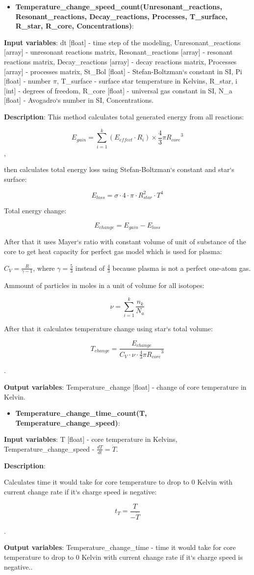 \documentclass[a4paper,12pt]{article}
\newcommand{\namefunction}[4]{
  \begin{itemize}
    \item \textbf{#1}:
  \end{itemize}
  
  \textbf{Input variables}: #2.
  
  \textbf{Description}: #3.
  
  \textbf{Output variables}: #4.
}
\begin{document}
\namefunction{Temperature\_change\_speed\_count(Unresonant\_reactions, Resonant\_reactions, Decay\_reactions, Processes, T\_surface, R\_star, R\_core, Concentrations)}{dt [float] - time step of the modeling, Unresonant\_reactions [array] - unresonant reactions matrix, Resonant\_reactions [array] - resonant reactions matrix, Decay\_reactions [array] - decay reactions matrix, Processes [array] - processes matrix, St\_Bol [float] - Stefan-Boltzman`s constant in SI, Pi [float] - number $\pi$, T\_surface - surface star temperature in Kelvins, R\_star, i [int] - degrees of freedom, R\_core [float] - universal gas constant in SI, N\_a [float] - Avogadro`s number in SI, Concentrations}{This method calculates total generated energy from all reactions:

\[{E_{gain}} = \sum_{i = 1}^{k} ({E_{effect}} \cdot {R_i}) \times \frac{4}{3} \pi{R_{core}}^{3}\],

 then calculates total energy loss using Stefan-Boltzman`s constant and star`s surface:

\[E_{loss} = \sigma \cdot 4 \cdot \pi \cdot R_{star}^2 \cdot T^4\]

Total energy change:

\[E_{change} = E_{gain} - E_{loss}\]

After that it uses Mayer`s ratio with constant volume of unit of substance of the core to get heat capacity for perfect gas model which is used for plasma:

$C_{V} = \frac{R}{\gamma - 1}$, where $\gamma = \frac{5}{3}$ instead of $\frac{4}{3}$ because plasma is not a perfect one-atom gas.

Ammount of particles in moles in a unit of volume for all isotopes:

\[\nu = \sum_{i = 1}^{k} \frac{n_k}{N_a}\]

After that it calculates temperature change using star`s total volume:

\[T_{change} = \frac{E_{change}}{C_{V} \cdot \nu \cdot \frac{4}{3} \pi{R_{core}}^{3}}\]

}{Temperature\_change [float] - change of core temperature in Kelvin}

\namefunction{Temperature\_change\_time\_count(T, Temperature\_change\_speed)}{T [float] - core temperature in Kelvins, Temperature\_change\_speed - $\frac{dT}{dt} = \dot{T}$}{

Calculates time it would take for core temperature to drop to 0 Kelvin with current change rate if it`s charge speed is negative:

\[t_{T} = \frac{T}{-\dot{T}}\]

}{Temperature\_change\_time - time it would take for core temperature to drop to 0 Kelvin with current change rate if it`s charge speed is negative.}
\end{document}
